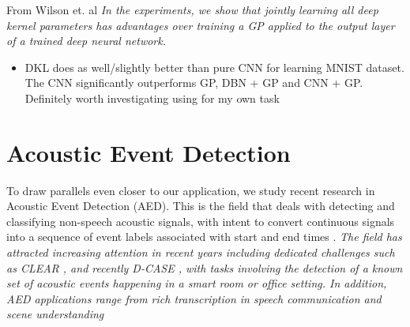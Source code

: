 \documentclass[12pt]{llncs}
\begin{document}
From Wilson et. al \cite{wilson2016deep}
\emph{In the experiments, we show that jointly learning all deep kernel parameters has advantages over training a GP applied to the output layer of a trained deep neural network.}

\begin{itemize}
	\item DKL does as well/slightly better than pure CNN for learning MNIST dataset. The CNN significantly outperforms GP, DBN + GP and CNN + GP. Definitely worth investigating using for my own task
\end{itemize}


\section{Acoustic Event Detection}
\label{sec:AED}
To draw parallels even closer to our application, we study recent research in Acoustic Event Detection (AED). This is the field that deals with detecting and classifying non-speech acoustic signals, with intent to convert continuous signals into a sequence of event labels associated with start and end times \cite{espi2015exploiting}. \emph{The field has attracted increasing
attention in recent years including dedicated challenges
such as CLEAR \cite{mostefa2007chil}, and recently D-CASE \cite{giannoulis2013detection}, with tasks
involving the detection of a known set of acoustic events
happening in a smart room or office setting. In addition,
AED applications range from rich transcription in
speech communication \cite{mostefa2007chil,giannoulis2013detection} and scene understanding}
\end{document}
